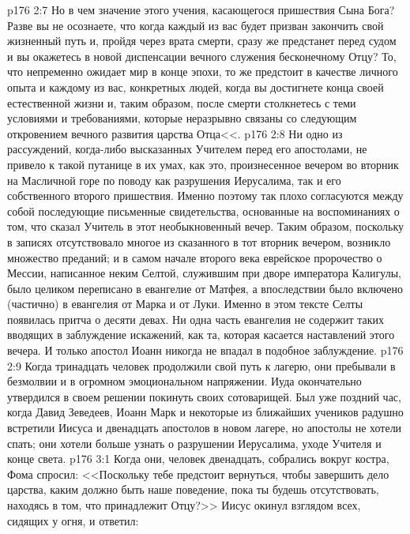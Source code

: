 \vs p176 2:7 Но в чем значение этого учения, касающегося пришествия Сына Бога? Разве вы не осознаете, что когда каждый из вас будет призван закончить свой жизненный путь и, пройдя через врата смерти, сразу же предстанет перед судом и вы окажетесь в новой диспенсации вечного служения бесконечному Отцу? То, что непременно ожидает мир в конце эпохи, то же предстоит в качестве личного опыта и каждому из вас, конкретных людей, когда вы достигнете конца своей естественной жизни и, таким образом, после смерти столкнетесь с теми условиями и требованиями, которые неразрывно связаны со следующим откровением вечного развития царства Отца<<.
\vs p176 2:8 Ни одно из рассуждений, когда\hyp{}либо высказанных Учителем перед его апостолами, не привело к такой путанице в их умах, как это, произнесенное вечером во вторник на Масличной горе по поводу как разрушения Иерусалима, так и его собственного второго пришествия. Именно поэтому так плохо согласуются между собой последующие письменные свидетельства, основанные на воспоминаниях о том, что сказал Учитель в этот необыкновенный вечер. Таким образом, поскольку в записях отсутствовало многое из сказанного в тот вторник вечером, возникло множество преданий; и в самом начале второго века еврейское пророчество о Мессии, написанное неким Селтой, служившим при дворе императора Калигулы, было целиком переписано в евангелие от Матфея, а впоследствии было включено (частично) в евангелия от Марка и от Луки. Именно в этом тексте Селты появилась притча о десяти девах. Ни одна часть евангелия не содержит таких вводящих в заблуждение искажений, как та, которая касается наставлений этого вечера. И только апостол Иоанн никогда не впадал в подобное заблуждение.
\vs p176 2:9 Когда тринадцать человек продолжили свой путь к лагерю, они пребывали в безмолвии и в огромном эмоциональном напряжении. Иуда окончательно утвердился в своем решении покинуть своих сотоварищей. Был уже поздний час, когда Давид Зеведеев, Иоанн Марк и некоторые из ближайших учеников радушно встретили Иисуса и двенадцать апостолов в новом лагере, но апостолы не хотели спать; они хотели больше узнать о разрушении Иерусалима, уходе Учителя и конце света.
\vs p176 3:1 Когда они, человек двенадцать, собрались вокруг костра, Фома спросил: <<Поскольку тебе предстоит вернуться, чтобы завершить дело царства, каким должно быть наше поведение, пока ты будешь отсутствовать, находясь в том, что принадлежит Отцу?>> Иисус окинул взглядом всех, сидящих у огня, и ответил:

